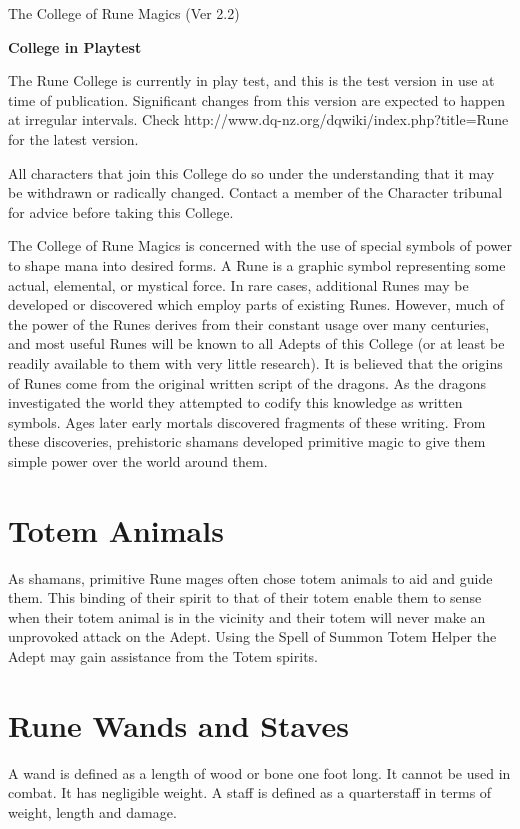 \begin{Chapter}{The College of Rune Magics (Ver 2.2)}

\textbf{College in Playtest}

The Rune College is currently in play test, and this is the test
version in use at time of publication.  Significant changes from this
version are expected to happen at irregular intervals. Check
http://www.dq-nz.org/dqwiki/index.php?title=Rune for the latest
version.

All characters that join this College do so under the understanding
that it may be withdrawn or radically changed.  Contact a member of
the Character tribunal for advice before taking this College.

The College of Rune Magics is concerned with the use of special
symbols of power to shape mana into desired forms.  A Rune is a
graphic symbol representing some actual, elemental, or mystical force.
In rare cases, additional Runes may be developed or discovered which
employ parts of existing Runes. However, much of the power of the
Runes derives from their constant usage over many centuries, and most
useful Runes will be known to all Adepts of this College (or at least
be readily available to them with very little research). It is
believed that the origins of Runes come from the original written
script of the dragons. As the dragons investigated the world they
attempted to codify this knowledge as written symbols.  Ages later
early mortals discovered fragments of these writing.  From these
discoveries, prehistoric shamans developed primitive magic to give
them simple power over the world around them.


\section{Totem Animals}

As shamans, primitive Rune mages often chose totem animals to aid and
guide them. This binding of their spirit to that of their totem enable
them to sense when their totem animal is in the vicinity and their
totem will never make an unprovoked attack on the Adept.  Using the
Spell of Summon Totem Helper the Adept may gain assistance from the
Totem spirits.


\section{Rune Wands and Staves}

A wand is defined as a length of wood or bone one foot long. It cannot
be used in combat. It has negligible weight.  A staff is defined as a
quarterstaff in terms of weight, length and damage.


\end{Chapter}
